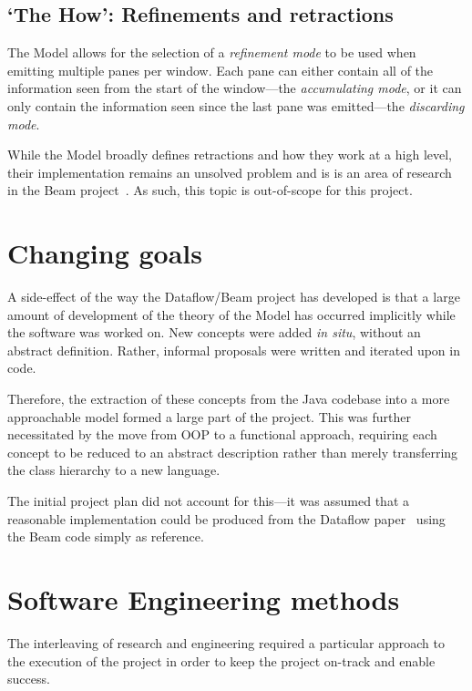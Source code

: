 \subsection{`The How': Refinements and retractions}\label{sec:prep:dataflow:how}

The Model allows for the selection of a \emph{refinement mode} to be used when emitting multiple panes per window.
Each pane can either contain all of the information seen from the start of the window---the \emph{accumulating mode}, or it can only contain the information seen since the last pane was emitted---the \emph{discarding mode}.

While the Model broadly defines retractions and how they work at a high level, their implementation remains an unsolved problem and is is an area of research in the Beam project~\cite{JIRA-retractions}.
As such, this topic is out-of-scope for this project.

\section{Changing goals}\label{sec:prep:goals}

A side-effect of the way the Dataflow/Beam project has developed is that a large amount of development of the theory of the Model has occurred implicitly while the software was worked on.
New concepts were added \emph{in situ}, without an abstract definition.
Rather, informal proposals were written and iterated upon in code.

Therefore, the extraction of these concepts from the Java codebase into a more approachable model formed a large part of the project.
This was further necessitated by the move from OOP to a functional approach, requiring each concept to be reduced to an abstract description rather than merely transferring the class hierarchy to a new language.

The initial project plan did not account for this---it was assumed that a reasonable implementation could be produced from the Dataflow paper~\cite{Akidau:2015} using the Beam code simply as reference.

\section{Software Engineering methods}\label{sec:prep:softeng}

The interleaving of research and engineering required a particular approach to the execution of the project in order to keep the project on-track and enable success.

